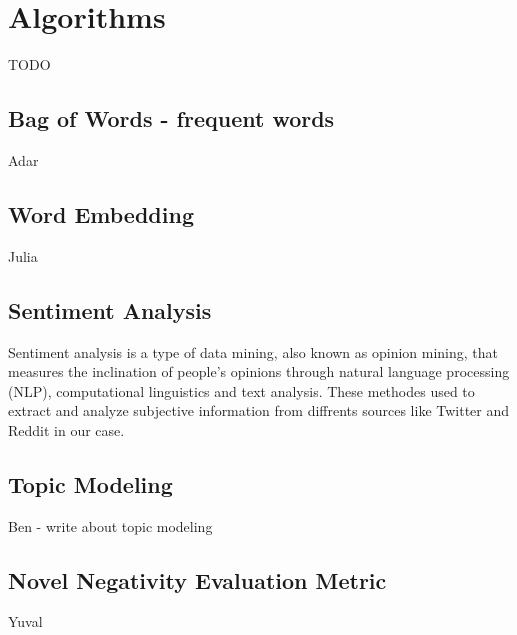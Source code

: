 \section{Algorithms}
TODO


\subsection{Bag of Words - frequent words}
Adar

\subsection{Word Embedding}
Julia

\subsection{Sentiment Analysis}
Sentiment analysis is a type of data mining, also known as opinion mining, 
that measures the inclination of people’s opinions through natural language processing (NLP), computational linguistics and text analysis. These methodes used to extract and analyze subjective information from diffrents sources like Twitter and Reddit in our case.

\subsection{Topic Modeling}
Ben - write about topic modeling

\subsection{Novel Negativity Evaluation Metric}
Yuval 